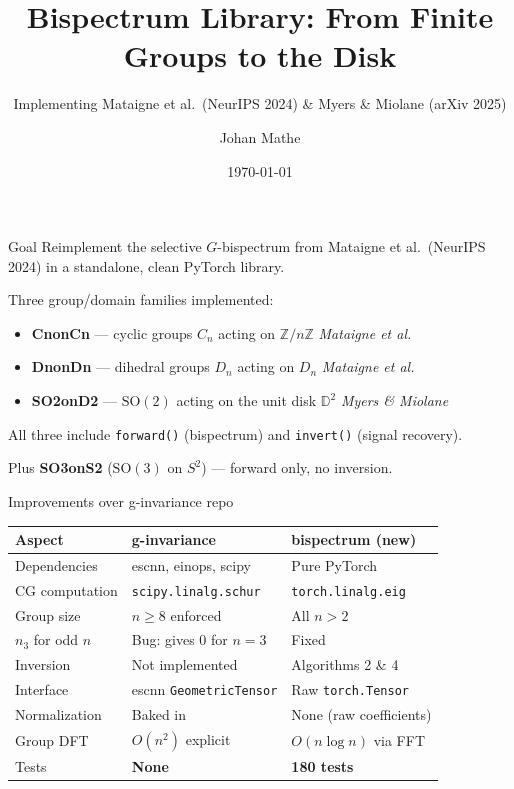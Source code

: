 \documentclass[aspectratio=169]{beamer}
\title{Bispectrum Library: From Finite Groups to the Disk}
\subtitle{Implementing Mataigne et al.\ (NeurIPS 2024) \& Myers \& Miolane (arXiv 2025)}
\author{Johan Mathe}
\date{\today}
\begin{document}
\maketitle

\begin{frame}{Goal}
  Reimplement the selective $G$-bispectrum from Mataigne et al.\ (NeurIPS 2024)
  in a standalone, clean PyTorch library.

  \bigskip

  Three group/domain families implemented:
  \begin{itemize}
    \item \textbf{CnonCn} --- cyclic groups $C_n$ acting on $\mathbb{Z}/n\mathbb{Z}$ \hfill\textit{Mataigne et al.}
    \item \textbf{DnonDn} --- dihedral groups $D_n$ acting on $D_n$ \hfill\textit{Mataigne et al.}
    \item \textbf{SO2onD2} --- $\mathrm{SO}(2)$ acting on the unit disk $\mathbb{D}^2$ \hfill\textit{Myers \& Miolane}
  \end{itemize}

  \bigskip

  All three include \texttt{forward()} (bispectrum) and \texttt{invert()} (signal recovery).

  \smallskip

  Plus \textbf{SO3onS2} ($\mathrm{SO}(3)$ on $S^2$) --- forward only, no inversion.
\end{frame}

\begin{frame}{Improvements over g-invariance repo}
  \begin{table}
    \scriptsize
    \begin{tabular}{lll}
      \toprule
      \textbf{Aspect} & \textbf{g-invariance} & \textbf{bispectrum (new)} \\
      \midrule
      Dependencies & escnn, einops, scipy & Pure PyTorch \\
      CG computation & \texttt{scipy.linalg.schur} & \texttt{torch.linalg.eig} \\
      Group size & $n \geq 8$ enforced & All $n > 2$ \\
      $n_3$ for odd $n$ & Bug: gives 0 for $n=3$ & Fixed \\
      Inversion & Not implemented & Algorithms 2 \& 4 \\
      Interface & escnn \texttt{GeometricTensor} & Raw \texttt{torch.Tensor} \\
      Normalization & Baked in & None (raw coefficients) \\
      Group DFT & $O(n^2)$ explicit & $O(n \log n)$ via FFT \\
      Tests & \textbf{None} & \textbf{180 tests} \\
      \bottomrule
    \end{tabular}
  \end{table}
\end{frame}
\end{document}
